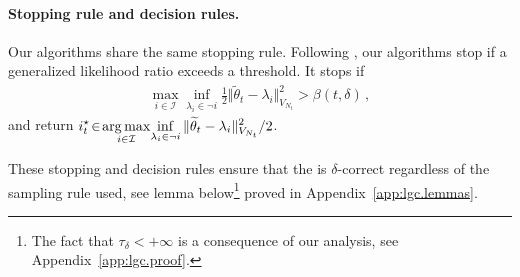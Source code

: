 
\paragraph{Stopping rule and decision rules.}
Our algorithms share the same stopping rule. Following \citet{garivier2016tracknstop}, our algorithms stop if a generalized likelihood ratio exceeds a threshold. It stops if
\begin{align}
\label{eq:def_chernoff_stopping}
\max_{i\in \mathcal I} \inf_{\lambda_i \in \neg i}\frac{1}{2}\Vert \tilde{\theta}_t - \lambda_i \Vert^2_{V_{N_t}}
> \beta(t,\delta)\,,
\end{align}
and return {\small $\displaystyle i^\star_t\! \in\! \operatorname*{arg\,max}_{i\in \mathcal I}\! \inf_{\lambda_i \in \neg i}\Vert \widetilde{\theta}_t - \lambda_i \Vert^2_{V_{N_t}}/2$}.


These stopping and decision rules ensure that the \LG{} is $\delta$-correct regardless of the sampling rule used, see lemma below\footnote{The fact that $\tau_\delta <+\infty$ is a consequence of our analysis, see Appendix~\ref{app:lgc.proof}.} proved in Appendix~\ref{app:lgc.lemmas}.

